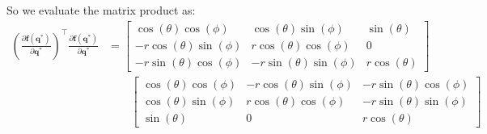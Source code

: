 \documentclass[titlepage]{article}
\begin{document}
So we evaluate the matrix product as:
\begin{equation}
	\begin{split}
		\left(\frac{\partial\boldsymbol{f}(\boldsymbol{q}^*)}{\partial\boldsymbol{q}^*}\right)^\top\frac{\partial\boldsymbol{f}(\boldsymbol{q}^*)}{\partial\boldsymbol{q}^*}&=
		\begin{bmatrix}
			\cos(\theta)\cos(\phi) & \cos(\theta)\sin(\phi) & \sin(\theta) \\
			-r\cos(\theta)\sin(\phi) & r\cos(\theta)\cos(\phi) & 0 \\
			-r\sin(\theta)\cos(\phi) & -r\sin(\theta)\sin(\phi) & r\cos(\theta)
		\end{bmatrix} \\
		&\qquad
		\begin{bmatrix}
			\cos(\theta)\cos(\phi) & -r\cos(\theta)\sin(\phi) & -r\sin(\theta)\cos(\phi) \\
			\cos(\theta)\sin(\phi) & r\cos(\theta)\cos(\phi) & -r\sin(\theta)\sin(\phi) \\
			\sin(\theta) & 0 & r\cos(\theta)
		\end{bmatrix}
	\end{split}
\end{equation}

\newpage
\end{document}
